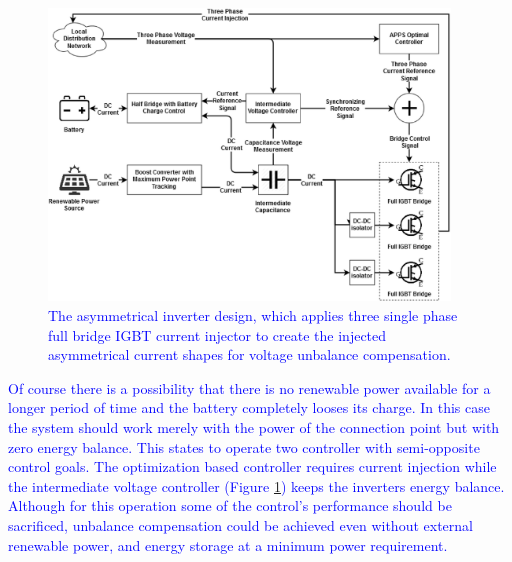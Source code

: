 

        \begin{figure}[ht]
        \centering
        \includegraphics[width=0.95\textwidth]{Unblance_EPS_Pics/inverter.eps}
        \caption{\textcolor{blue}{The asymmetrical inverter design, which applies three single phase full bridge IGBT current injector to create the injected asymmetrical current shapes for voltage unbalance compensation. }}
        \label{fig:inv}
        \end{figure}

    \textcolor{blue}{
        Of course there is a possibility that there is no renewable power available for a longer period of time and the battery completely looses its charge. In this case the system should work merely with the power of the connection point but with  zero energy balance. This states to operate two controller with semi-opposite control goals. The optimization based controller requires current injection while the intermediate voltage controller (Figure \ref{fig:inv}) keeps the inverters energy balance. Although for this operation some of the control's performance should be sacrificed, unbalance compensation could be achieved even without external renewable power, and energy storage at a minimum power requirement.}
%

